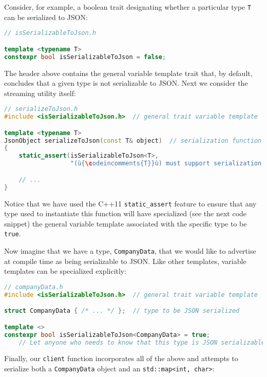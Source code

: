 {Consider, for example, a boolean trait designating whether a particular
type \texttt{T} can be serialized to JSON:

\begin{lstlisting}[language=C++]
// isSerializableToJson.h

template <typename T>
constexpr bool isSerializableToJson = false;
\end{lstlisting}

\noindent The header above contains the general variable template trait that, by
default, concludes that a given type is not serializable to JSON. Next
we consider the streaming utility itself:

\begin{lstlisting}[language=C++]
// serializeToJson.h
#include <isSerializableToJson.h>  // general trait variable template

template <typename T>
JsonObject serializeToJson(const T& object)  // serialization function template
{
    static_assert(isSerializableToJson<T>,
                  "(ù{\codeincomments{T}}ù) must support serialization to JSON.");

    // ...
}
\end{lstlisting}

\noindent Notice that we have used the C++11
\texttt{static\_assert} feature to ensure that any type
used to instantiate this function will have specialized (see the next code snippet) the
general variable template associated with the specific type to be
\texttt{true}.

Now imagine that we have a type, \texttt{CompanyData}, that we would
like to advertise at compile time as being serializable to JSON. Like
other templates, variable templates can be specialized explicitly:

\begin{lstlisting}[language=C++]
// companyData.h
#include <isSerializableToJson.h>  // general trait variable template

struct CompanyData { /* ... */ };  // type to be JSON serialized

template <>
constexpr bool isSerializableToJson<CompanyData> = true;
    // Let anyone who needs to know that this type is JSON serializable.
\end{lstlisting}

\noindent Finally, our \texttt{client} function incorporates all of the above and
attempts to serialize both a \texttt{CompanyData} object and an
\texttt{std::map<int,}~\texttt{char>}:

}
